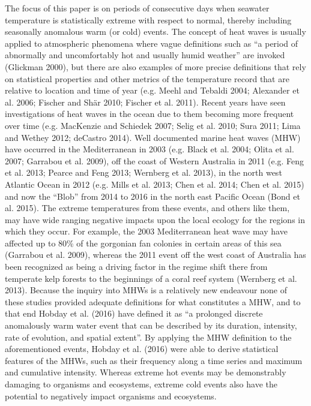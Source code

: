 \documentclass[a4paper,10pt,review]{elsarticle}
\begin{document}
The focus of this paper is on periods of consecutive days when seawater temperature is statistically extreme with respect to normal, thereby including seasonally anomalous warm (or cold) events. The concept of heat waves is usually applied to atmospheric phenomena where vague definitions such as ``a period of abnormally and uncomfortably hot and usually humid weather'' are invoked (Glickman 2000), but there are also examples of more precise definitions that rely on statistical properties and other metrics of the temperature record that are relative to location and time of year (e.g. Meehl and Tebaldi 2004; Alexander et al. 2006; Fischer and Shär 2010; Fischer et al. 2011). Recent years have seen investigations of heat waves in the ocean due to them becoming more frequent over time (e.g. MacKenzie and Schiedek 2007; Selig et al. 2010; Sura 2011; Lima and Wethey 2012; deCastro 2014). Well documented marine heat waves (MHW) have occurred in the Mediterranean in 2003 (e.g. Black et al. 2004; Olita et al. 2007; Garrabou et al. 2009), off the coast of Western Australia in 2011 (e.g. Feng et al. 2013; Pearce and Feng 2013; Wernberg et al. 2013), in the north west Atlantic Ocean in 2012 (e.g. Mills et al. 2013; Chen et al. 2014; Chen et al. 2015) and now the ``Blob'' from 2014 to 2016 in the north east Pacific Ocean (Bond et al. 2015). The extreme temperatures from these events, and others like them, may have wide ranging negative impacts upon the local ecology for the regions in which they occur. For example, the 2003 Mediterranean heat wave may have affected up to 80\% of the gorgonian fan colonies in certain areas of this sea (Garrabou et al. 2009), whereas the 2011 event off the west coast of Australia has been recognized as being a driving factor in the regime shift there from temperate kelp forests to the beginnings of a coral reef system (Wernberg et al. 2013). Because the inquiry into MHWs is a relatively new endeavour none of these studies provided adequate definitions for what constitutes a MHW, and to that end Hobday et al. (2016) have defined it as ``a prolonged discrete anomalously warm water event that can be described by its duration, intensity, rate of evolution, and spatial extent''. By applying the MHW definition to the aforementioned events, Hobday et al. (2016) were able to derive statistical features of the MHWs, such as their frequency along a time series and maximum and cumulative intensity. Whereas extreme hot events may be demonstrably damaging to organisms and ecosystems, extreme cold events also have the potential to negatively impact organisms and ecosystems.
\end{document}
